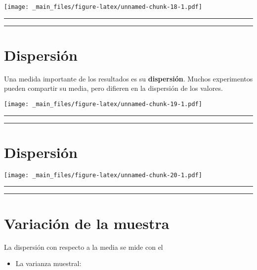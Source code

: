 \documentclass[
]{book}
\providecommand{\tightlist}{%
  \setlength{\itemsep}{0pt}\setlength{\parskip}{0pt}}
\begin{document}
\texttt{[image: \_main\_files/figure-latex/unnamed-chunk-18-1.pdf]}

\begin{center}\rule{0.5\linewidth}{0.5pt}\end{center}

\begin{center}\rule{0.5\linewidth}{0.5pt}\end{center}

\hypertarget{dispersiuxf3n}{%
\section{Dispersión}\label{dispersiuxf3n}}

Una medida importante de los resultados es su \textbf{dispersión}. Muchos experimentos pueden compartir su media, pero difieren en la dispersión de los valores.

\texttt{[image: \_main\_files/figure-latex/unnamed-chunk-19-1.pdf]}

\begin{center}\rule{0.5\linewidth}{0.5pt}\end{center}

\begin{center}\rule{0.5\linewidth}{0.5pt}\end{center}

\hypertarget{dispersiuxf3n-1}{%
\section{Dispersión}\label{dispersiuxf3n-1}}

\texttt{[image: \_main\_files/figure-latex/unnamed-chunk-20-1.pdf]}

\begin{center}\rule{0.5\linewidth}{0.5pt}\end{center}

\begin{center}\rule{0.5\linewidth}{0.5pt}\end{center}

\hypertarget{variaciuxf3n-de-la-muestra}{%
\section{Variación de la muestra}\label{variaciuxf3n-de-la-muestra}}

La dispersión con respecto a la media se mide con el

\begin{itemize}
\tightlist
\item
  La varianza muestral:
\end{itemize}
\end{document}
